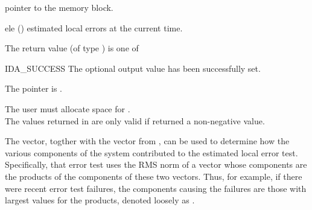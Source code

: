 {{\begin{args}
    pointer to the {\idas} memory block.
  \item[ele] ()
    estimated local errors at the current time.
  \end{args}
}
{
  The return value  (of type ) is one of
  \begin{args}
  \item[IDA\_SUCCESS] 
    The optional output value has been successfully set.
  \item[\Id{IDA\_MEM\_NULL}]
    The  pointer is .
  \end{args}
}
{
  {\warn}The user must allocate space for . \\
  The values returned in  are only valid if
   returned a non-negative value.

  The  vector, togther with the  vector from
  , can be used to determine how the various
  components of the system contributed to the estimated local error
  test.  Specifically, that error test uses the RMS norm of a vector
  whose components are the products of the components of these two vectors.
  Thus, for example, if there were recent error test failures, the components
  causing the failures are those with largest values for the products,
  denoted loosely as .

}}
